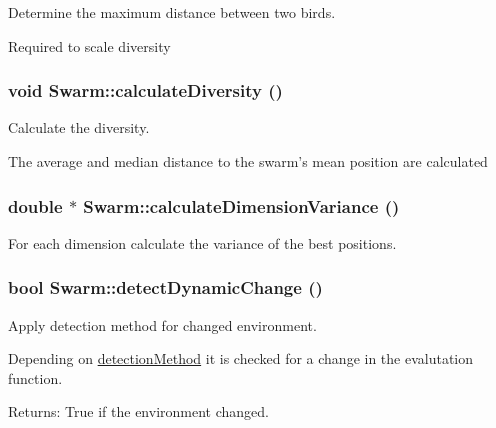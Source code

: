 Determine the maximum distance between two birds. 

Required to scale diversity \hypertarget{classSwarm_849d8809ea9c26d9bc0010968bf1020c}{
\subsubsection{\setlength{\rightskip}{0pt plus 5cm}void Swarm::calculateDiversity ()}}
\label{classSwarm_849d8809ea9c26d9bc0010968bf1020c}


Calculate the diversity. 

The average and median distance to the swarm's mean position are calculated \hypertarget{classSwarm_e8074ca91d00f4dd90b2d1101db2b9cd}{
\subsubsection{\setlength{\rightskip}{0pt plus 5cm}double $\ast$ Swarm::calculateDimensionVariance ()}}
\label{classSwarm_e8074ca91d00f4dd90b2d1101db2b9cd}


For each dimension calculate the variance of the best positions. 

\hypertarget{classSwarm_2ff0a2521e41d8b26e031e5a08c583b5}{
\subsubsection{\setlength{\rightskip}{0pt plus 5cm}bool Swarm::detectDynamicChange ()}}
\label{classSwarm_2ff0a2521e41d8b26e031e5a08c583b5}


Apply detection method for changed environment. 

Depending on \hyperlink{classSwarm_fccbdf32a0ea11cb33665d64ffb15c56}{detectionMethod} it is checked for a change in the evalutation function. \begin{Desc}
\item[Returns:]True if the environment changed. \end{Desc}


